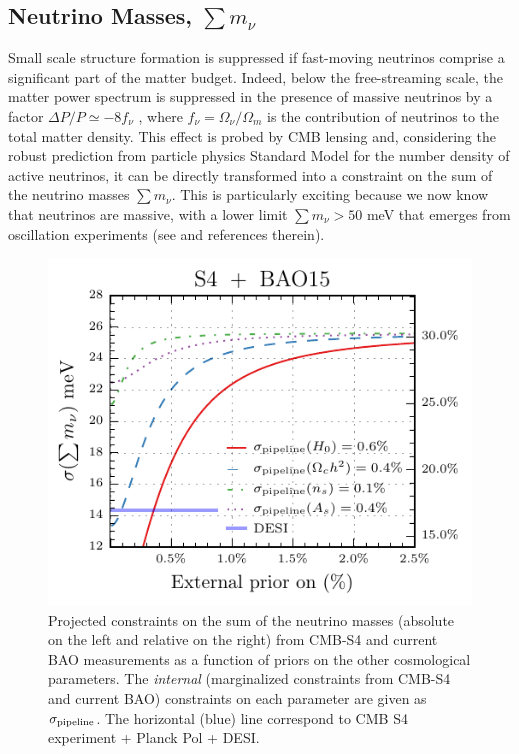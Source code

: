 \documentclass[aps,prd,reprint,superscriptaddress,nofootinbib,floatfix]{revtex4-1}
\begin{document}
\subsection{Neutrino Masses, $\sum m_\nu$}



Small scale structure formation is suppressed if fast-moving neutrinos comprise a significant part of the matter budget. 
Indeed, below the free-streaming scale, the matter power spectrum is suppressed in the presence of
massive neutrinos by a factor $\Delta P/P\simeq -8f_{\nu}$ , where $f_{\nu} = \Omega_{\nu} / \Omega_{m}$ is the contribution of neutrinos to the total matter density.
This effect is probed by CMB lensing and, considering the robust prediction from particle physics Standard Model for the number density of active neutrinos, it can be directly transformed into a constraint on the sum of the neutrino masses $\sum m_\nu$. This is particularly exciting because we now know that neutrinos are massive, with a lower limit $\sum m_\nu>50$ meV that emerges from oscillation experiments (see \cite{bellini:2013} and references therein). 
 


\begin{figure}[htbp]
\begin{center}
\includegraphics{prior_omnuh2_lmin4}
\caption{Projected constraints on the sum of the neutrino masses (absolute on the left and relative on the right) from CMB-S4 and current BAO measurements as a function of priors on the other cosmological parameters. The {\it internal} (marginalized constraints from CMB-S4 and current BAO) constraints on each parameter are given as $\sigma_{\rm pipeline}$. The horizontal (blue) line correspond to CMB S4 experiment + Planck Pol + DESI.}
\label{fig:prior_omeganuh2-h}
\end{center}
\end{figure}
\end{document}
